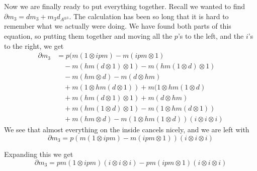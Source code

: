 Now we are finally ready to put everything together. Recall we wanted to find $\partial m_3 = dm_3 + m_3d_{A^{\otimes 3}}$. The calculation has been so long that it is hard to remember what we actually were doing. We have found both parts of this equation, so putting them together and moving all the $p$'s to the left, and the $i$'s to the right, we get
\begin{align*}
    \partial m_3
    &=
    p(m(1\otimes ipm)-m(ipm\otimes 1) \\
    &\quad - m(hm(d\otimes 1)\otimes 1) - m(hm(1\otimes d)\otimes 1) \\
    &\quad -m(hm\otimes d)-m(d\otimes hm) \\
    &\quad +m(1\otimes hm(d\otimes 1))+m(1\otimes hm(1\otimes d) \\
    &\quad
    +m(hm(d\otimes 1)\otimes 1)
    +m(d\otimes hm) \\
    &\quad 
    +m(hm(1\otimes d)\otimes 1)
    -m(1\otimes hm(d\otimes 1)) \\
    &\quad  
    +m(hm\otimes d)
    -m(1\otimes hm(1\otimes d))(i\otimes i\otimes i)
\end{align*}
We see that almost everything on the inside cancels nicely, and we are left with 
\begin{equation*}
    \partial m_3 = p(m(1\otimes ipm)-m(ipm\otimes 1))(i\otimes i\otimes i)
\end{equation*}

Expanding this we get 
\begin{equation*}
    \partial m_3 = pm(1\otimes ipm)(i\otimes i\otimes i) - pm(ipm\otimes 1)(i\otimes i\otimes i)
\end{equation*}

